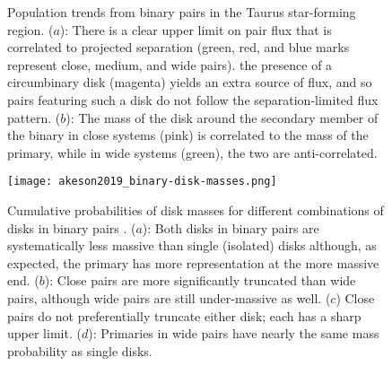 \begin{figure}[h]
  \caption{Population trends from binary pairs in the Taurus star-forming region. ($a$): There is a clear upper limit on pair flux that is correlated to projected separation (green, red, and blue marks represent close, medium, and wide pairs). the presence of a circumbinary disk (magenta) yields an extra source of flux, and so pairs featuring such a disk do not follow the separation-limited flux pattern. ($b$): The mass of the disk around the secondary member of the binary in close systems (pink) is correlated to the mass of the primary, while in wide systems (green), the two are anti-correlated.}
  \label{fig:taurus_binaries}
\end{figure}

\begin{figure}[h]
  \texttt{[image: akeson2019\_binary-disk-masses.png]}%
  \caption{Cumulative probabilities of disk masses for different combinations of disks in binary pairs \citep{Akeson2019}. ($a$): Both disks in binary pairs are systematically less massive than single (isolated) disks although, as expected, the primary has more representation at the more massive end. ($b$): Close pairs are more significantly truncated than wide pairs, although wide pairs are still under-massive as well. ($c$) Close pairs do not preferentially truncate either disk; each has a sharp upper limit. ($d$): Primaries in wide pairs have nearly the same mass probability as single disks.}
  \label{fig:binary-disk-masses}
\end{figure}



